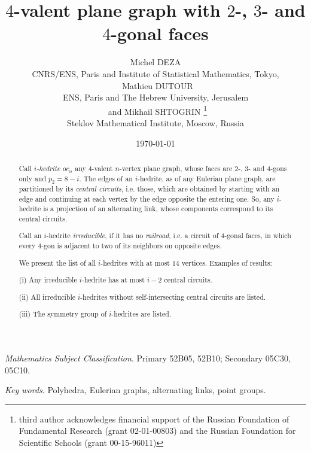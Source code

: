 \documentclass[12pt]{article}
\begin{document}
\title{$4$-valent plane graph with $2$-, $3$- and $4$-gonal faces}


\author{Michel DEZA \\
  CNRS/ENS, Paris and Institute of Statistical Mathematics, 
Tokyo,\\
\ Mathieu DUTOUR \\
 ENS, Paris and The Hebrew University, Jerusalem\\
\ and  Mikhail SHTOGRIN \thanks{third author acknowledges financial support 
of the Russian Foundation of Fundamental Research (grant 02-01-00803)
and the Russian Foundation for Scientific Schools (grant 00-15-96011)}\\
Steklov Mathematical Institute, Moscow, Russia} 
\date{\today}

\maketitle



\begin{abstract}
Call {\em $i$-hedrite $oc_n$} any $4$-valent $n$-vertex plane graph, whose 
faces are $2$-, $3$- and $4$-gons only and $p_2=8-i$. The edges of an $i$-hedrite, as of 
any Eulerian plane graph, are partitioned
by its {\em central circuits}, i.e. those, which are obtained by starting with an
edge and continuing at each vertex by the edge opposite the entering one. 
So, any $i$-hedrite is a projection of an alternating link, whose components
correspond to its central circuits.

Call an $i$-hedrite {\em irreducible}, if it has no 
{\em railroad}, i.e. a 
circuit of $4$-gonal faces, in which every $4$-gon is adjacent to two of its 
neighbors on opposite edges.

We present the list of all $i$-hedrites with at most $14$ vertices. Examples of results: 

(i) Any irreducible $i$-hedrite has at most $i-2$ central circuits.

(ii) All irreducible $i$-hedrites without self-intersecting central circuits are listed.

(iii) The symmetry group of $i$-hedrites are listed.

\end{abstract}

{\em Mathematics Subject Classification}. Primary 52B05, 52B10;
Secondary 05C30, 05C10.

{\em Key words}. Polyhedra, Eulerian graphs, alternating links, point groups.
\end{document}
